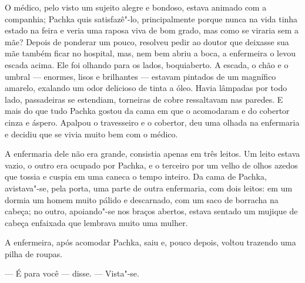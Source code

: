 O médico, pelo visto um sujeito alegre e bondoso, estava animado com a
companhia; Pachka quis satisfazê"-lo, principalmente porque nunca na vida
tinha estado na feira e veria uma raposa viva de bom grado, mas como se
viraria sem a mãe? Depois de ponderar um pouco, resolveu pedir ao doutor
que deixasse sua mãe também ficar no hospital, mas, nem bem abriu a
boca, a enfermeira o levou escada acima. Ele foi olhando para os lados,
boquiaberto. A escada, o chão e o umbral --- enormes, lisos e brilhantes
--- estavam pintados de um magnífico amarelo, exalando um odor delicioso
de tinta a óleo. Havia lâmpadas por todo lado, passadeiras se estendiam,
torneiras de cobre ressaltavam nas paredes. E mais do que tudo Pachka
gostou da cama em que o acomodaram e do cobertor cinza e áspero. Apalpou
o travesseiro e o cobertor, deu uma olhada na enfermaria e decidiu que
se vivia muito bem com o médico.

A enfermaria dele não era grande, consistia apenas em três leitos. Um
leito estava vazio, o outro era ocupado por Pachka, e o terceiro por um
velho de olhos azedos que tossia e cuspia em uma caneca o tempo inteiro.
Da cama de Pachka, avistava"-se, pela porta, uma parte de outra
enfermaria, com dois leitos: em um dormia um homem muito pálido e
descarnado, com um saco de borracha na cabeça; no outro, apoiando"-se nos
braços abertos, estava sentado um mujique de cabeça enfaixada que
lembrava muito uma mulher.

A enfermeira, após acomodar Pachka, saiu e, pouco depois, voltou
trazendo uma pilha de roupas.

--- É para você --- disse. --- Vista"-se.

